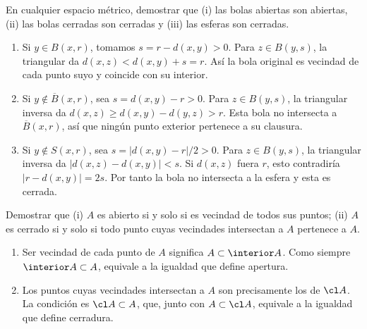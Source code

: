 \begin{ejercicio}\label{ej:lectura-2-6}
En cualquier espacio métrico, demostrar que (i) las bolas abiertas son abiertas, (ii) las bolas cerradas son cerradas y (iii) las esferas son cerradas.
\end{ejercicio}
\begin{solucion}
\begin{enumerate}[label=(\roman*)]
\item Si $y\in B(x,r)$, tomamos $s=r-d(x,y)>0$. Para $z\in B(y,s)$, la triangular da $d(x,z)<d(x,y)+s=r$. Así la bola original es vecindad de cada punto suyo y coincide con su interior.
\item Si $y\notin\overline B(x,r)$, sea $s=d(x,y)-r>0$. Para $z\in B(y,s)$, la triangular inversa da $d(x,z)\ge d(x,y)-d(y,z)>r$. Esta bola no intersecta a $\overline B(x,r)$, así que ningún punto exterior pertenece a su clausura.
\item Si $y\notin S(x,r)$, sea $s=|d(x,y)-r|/2>0$. Para $z\in B(y,s)$, la triangular inversa da $|d(x,z)-d(x,y)|<s$. Si $d(x,z)$ fuera $r$, esto contradiría $|r-d(x,y)|=2s$. Por tanto la bola no intersecta a la esfera y esta es cerrada.
\end{enumerate}
\end{solucion}

\begin{ejercicio}\label{ej:lectura-2-7}
Demostrar que (i) $A$ es abierto si y solo si es vecindad de todos sus puntos; (ii) $A$ es cerrado si y solo si todo punto cuyas vecindades intersectan a $A$ pertenece a $A$.
\end{ejercicio}
\begin{solucion}
\begin{enumerate}[label=(\roman*)]
\item Ser vecindad de cada punto de $A$ significa $A\subset\interior A$. Como siempre $\interior A\subset A$, equivale a la igualdad que define apertura.
\item Los puntos cuyas vecindades intersectan a $A$ son precisamente los de $\cl A$. La condición es $\cl A\subset A$, que, junto con $A\subset\cl A$, equivale a la igualdad que define cerradura.
\end{enumerate}
\end{solucion}

